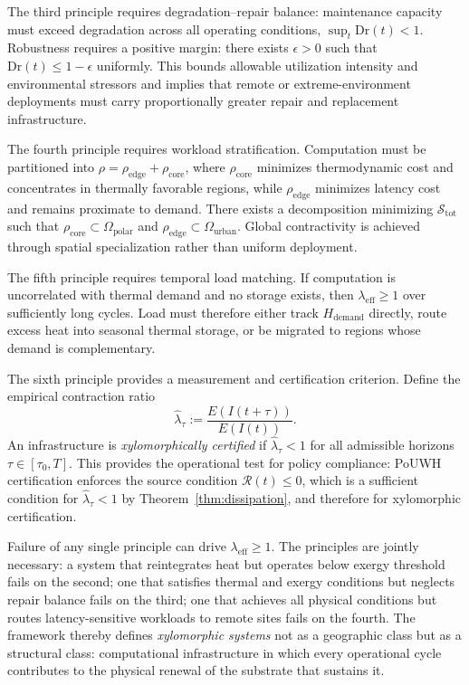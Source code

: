 \documentclass[10pt,twocolumn]{article}
\theoremstyle{plain}
\theoremstyle{definition}
\theoremstyle{remark}
\begin{document}
The third principle requires degradation--repair balance: maintenance
capacity must exceed degradation across all operating conditions,
$\sup_t \mathrm{Dr}(t) < 1$. Robustness requires a positive margin:
there exists $\epsilon > 0$ such that $\mathrm{Dr}(t) \leq 1 -
\epsilon$ uniformly. This bounds allowable utilization intensity and
environmental stressors and implies that remote or extreme-environment
deployments must carry proportionally greater repair and replacement
infrastructure.

The fourth principle requires workload stratification. Computation
must be partitioned into $\rho = \rho_{\mathrm{edge}} +
\rho_{\mathrm{core}}$, where $\rho_{\mathrm{core}}$ minimizes
thermodynamic cost and concentrates in thermally favorable regions,
while $\rho_{\mathrm{edge}}$ minimizes latency cost and remains
proximate to demand. There exists a decomposition minimizing
$\mathcal{S}_{\mathrm{tot}}$ such that $\rho_{\mathrm{core}} \subset
\Omega_{\mathrm{polar}}$ and $\rho_{\mathrm{edge}} \subset
\Omega_{\mathrm{urban}}$. Global contractivity is achieved through
spatial specialization rather than uniform deployment.

The fifth principle requires temporal load matching. If computation is
uncorrelated with thermal demand and no storage exists, then
$\lambda_{\mathrm{eff}} \geq 1$ over sufficiently long cycles. Load
must therefore either track $H_{\mathrm{demand}}$ directly, route
excess heat into seasonal thermal storage, or be migrated to regions
whose demand is complementary.

The sixth principle provides a measurement and certification criterion.
Define the empirical contraction ratio
\[
  \hat{\lambda}_\tau := \frac{E(I(t+\tau))}{E(I(t))}.
\]
An infrastructure is \emph{xylomorphically certified} if
$\hat{\lambda}_\tau < 1$ for all admissible horizons $\tau \in
[\tau_0, T]$. This provides the operational test for policy compliance:
PoUWH certification enforces the source condition $\mathcal{R}(t) \leq
0$, which is a sufficient condition for $\hat{\lambda}_\tau < 1$ by
Theorem~\ref{thm:dissipation}, and therefore for xylomorphic certification.

Failure of any single principle can drive $\lambda_{\mathrm{eff}} \geq
1$. The principles are jointly necessary: a system that reintegrates
heat but operates below exergy threshold fails on the second; one that
satisfies thermal and exergy conditions but neglects repair balance
fails on the third; one that achieves all physical conditions but
routes latency-sensitive workloads to remote sites fails on the fourth.
The framework thereby defines \emph{xylomorphic systems} not as a
geographic class but as a structural class: computational
infrastructure in which every operational cycle contributes to the
physical renewal of the substrate that sustains it.
\end{document}
